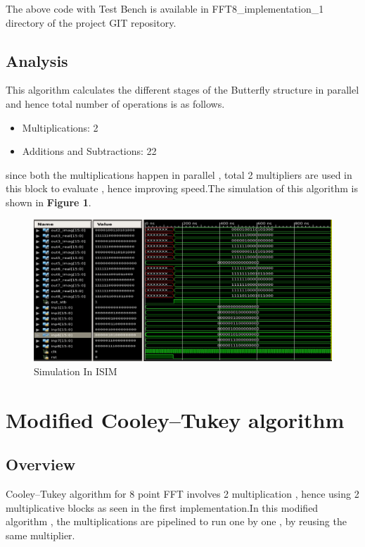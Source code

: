 \documentclass{article}
\begin{document}
The above code with Test Bench is available in FFT8\_implementation\_1 directory of the project GIT repository.



\subsection{Analysis}
This algorithm calculates the different stages of the Butterfly structure in parallel and hence total number of operations is as follows.
\begin{itemize}
  \item Multiplications: 2
  \item Additions and Subtractions: 22
\end{itemize}

since both the multiplications happen in parallel , total 2 multipliers are used in this block to evaluate , hence improving speed.The simulation of this algorithm is shown in \textbf{Figure 1}.


\begin{figure}[h!]
  \caption{Simulation In ISIM}
  \includegraphics[width=1.0\columnwidth]{simulation_images/figure_1.jpg} 
\end{figure}












\section{Modified Cooley–Tukey algorithm }
\label{modified_Cooley_Tukey_algorithm}

\subsection{Overview}
Cooley–Tukey algorithm for 8 point FFT involves 2 multiplication , hence using 2 multiplicative blocks as seen in the first implementation.In this modified algorithm , the multiplications are pipelined to run one by one , by reusing the same multiplier.
\end{document}

